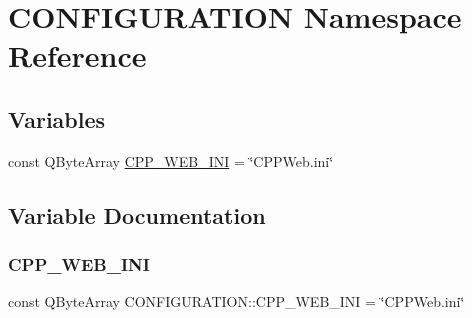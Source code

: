 \hypertarget{namespace_c_o_n_f_i_g_u_r_a_t_i_o_n}{}\section{C\+O\+N\+F\+I\+G\+U\+R\+A\+T\+I\+ON Namespace Reference}
\label{namespace_c_o_n_f_i_g_u_r_a_t_i_o_n}
\subsection*{Variables}
\begin{DoxyCompactItemize}
\item 
const Q\+Byte\+Array \hyperlink{namespace_c_o_n_f_i_g_u_r_a_t_i_o_n_a395a7c63b66332eb05d7c03e4b1562a0}{C\+P\+P\+\_\+\+W\+E\+B\+\_\+\+I\+NI} = \char`\"{}C\+P\+P\+Web.\+ini\char`\"{}
\end{DoxyCompactItemize}


\subsection{Variable Documentation}
\mbox{\label{namespace_c_o_n_f_i_g_u_r_a_t_i_o_n_a395a7c63b66332eb05d7c03e4b1562a0}} 
\subsubsection{\texorpdfstring{C\+P\+P\+\_\+\+W\+E\+B\+\_\+\+I\+NI}{CPP\_WEB\_INI}}
{\footnotesize\ttfamily const Q\+Byte\+Array C\+O\+N\+F\+I\+G\+U\+R\+A\+T\+I\+O\+N\+::\+C\+P\+P\+\_\+\+W\+E\+B\+\_\+\+I\+NI = \char`\"{}C\+P\+P\+Web.\+ini\char`\"{}}

